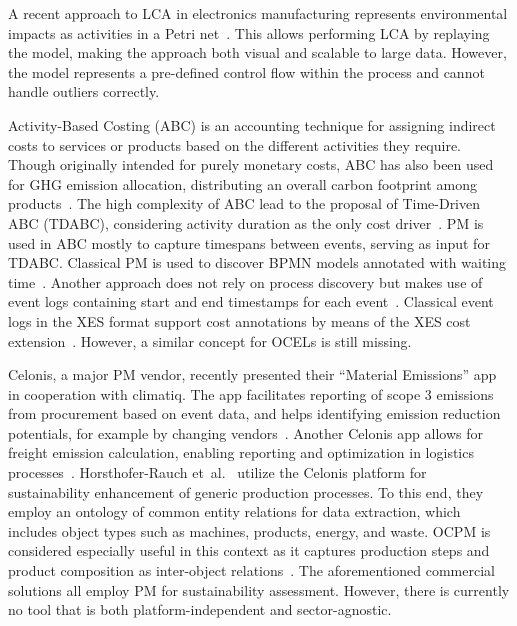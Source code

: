 A recent approach to LCA in electronics manufacturing represents environmental impacts as activities in a Petri net~\cite{Fritsch24scope}.
This allows performing LCA by replaying the model, making the approach both visual and scalable to large data. However, the model represents a pre-defined control flow within the process and cannot handle outliers correctly.

Activity-Based Costing (ABC) is an accounting technique for assigning indirect costs to services or products based on the different activities they require. 
Though originally intended for purely monetary costs, ABC has also been used for GHG emission allocation, distributing an overall carbon footprint among products~\cite{Tsai12integrating}. The high complexity of ABC lead to the proposal of Time-Driven ABC (TDABC), considering activity duration as the only cost driver~\cite{Kaplan04time}.
%
PM is used in ABC mostly to capture timespans between events, serving as input for TDABC. Classical PM is used to discover BPMN models annotated with waiting time~\cite{Halaska21tdabc}. Another approach does not rely on process discovery but makes use of event logs containing start and end timestamps for each event~\cite{Riesener21time}.
Classical event logs in the XES format support cost annotations by means of the XES cost extension~\cite{Wynn3framework}. However, a similar concept for OCELs is still missing.

Celonis, a major PM vendor, recently presented their ``Material Emissions'' app in cooperation with climatiq. The app facilitates reporting of scope 3 emissions from procurement based on event data, and helps identifying emission reduction potentials, for example by changing vendors~\cite{CelonisMaterial23,vanderAalst23twin}.
%
Another Celonis app allows for freight emission calculation, enabling reporting and optimization in logistics processes~\cite{CelonisFreight22}.
%
Horsthofer-Rauch et~al.~\cite{HorsthoferRauch24sustainability}
utilize the Celonis platform for sustainability enhancement of generic production processes. To this end, they employ an ontology of common entity relations for data extraction, which includes object types such as machines, products, energy, and waste.
OCPM is considered especially useful in this context as it captures production steps and product composition as inter-object relations~\cite{HorsthoferRauch24sustainability}.
%
The aforementioned commercial solutions all employ PM for sustainability assessment.
However, there is currently no tool that is both platform-independent and sector-agnostic.

